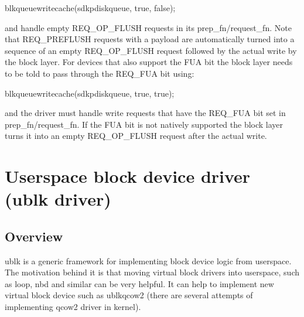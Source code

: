\documentclass[a4paper,11pt,english]{sphinxmanual}
\begin{document}
\begin{sphinxVerbatim}[commandchars=\\\{\}]
blk\PYGZus{}queue\PYGZus{}write\PYGZus{}cache(sdkp\PYGZhy{}\PYGZgt{}disk\PYGZhy{}\PYGZgt{}queue, true, false);
\end{sphinxVerbatim}

and handle empty REQ\_OP\_FLUSH requests in its prep\_fn/request\_fn.  Note that
REQ\_PREFLUSH requests with a payload are automatically turned into a sequence
of an empty REQ\_OP\_FLUSH request followed by the actual write by the block
layer.  For devices that also support the FUA bit the block layer needs
to be told to pass through the REQ\_FUA bit using:

\begin{sphinxVerbatim}[commandchars=\\\{\}]
blk\PYGZus{}queue\PYGZus{}write\PYGZus{}cache(sdkp\PYGZhy{}\PYGZgt{}disk\PYGZhy{}\PYGZgt{}queue, true, true);
\end{sphinxVerbatim}

and the driver must handle write requests that have the REQ\_FUA bit set
in prep\_fn/request\_fn.  If the FUA bit is not natively supported the block
layer turns it into an empty REQ\_OP\_FLUSH request after the actual write.


\chapter{Userspace block device driver (ublk driver)}
\label{\detokenize{ublk:userspace-block-device-driver-ublk-driver}}\label{\detokenize{ublk::doc}}

\section{Overview}
\label{\detokenize{ublk:overview}}
ublk is a generic framework for implementing block device logic from userspace.
The motivation behind it is that moving virtual block drivers into userspace,
such as loop, nbd and similar can be very helpful. It can help to implement
new virtual block device such as ublk\sphinxhyphen{}qcow2 (there are several attempts of
implementing qcow2 driver in kernel).
\end{document}

